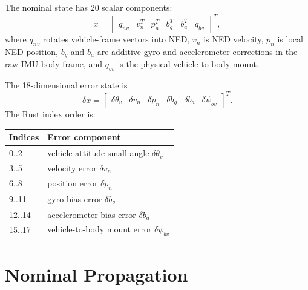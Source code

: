 \documentclass[11pt]{article}
\newcommand{\T}{^{T}}
\begin{document}
The nominal state has 20 scalar components:
\begin{equation}
  x=
  \begin{bmatrix}
  q_{nv} & v_n\T & p_n\T & b_g\T & b_a\T & q_{bv}
\end{bmatrix}\T ,
\end{equation}
where \(q_{nv}\) rotates vehicle-frame vectors into NED, \(v_n\) is NED
velocity, \(p_n\) is local NED position, \(b_g\) and \(b_a\) are additive gyro
and accelerometer corrections in the raw IMU body frame, and \(q_{bv}\) is the
physical vehicle-to-body mount.

The 18-dimensional error state is
\begin{equation}
  \delta x =
  \begin{bmatrix}
  \delta\theta_v &
  \delta v_n &
  \delta p_n &
  \delta b_g &
  \delta b_a &
  \delta\psi_{bv}
  \end{bmatrix}\T .
\end{equation}
The Rust index order is:
\begin{center}
\begin{tabular}{ll}
\toprule
Indices & Error component \\
\midrule
0..2 & vehicle-attitude small angle \(\delta\theta_v\) \\
3..5 & velocity error \(\delta v_n\) \\
6..8 & position error \(\delta p_n\) \\
9..11 & gyro-bias error \(\delta b_g\) \\
12..14 & accelerometer-bias error \(\delta b_a\) \\
15..17 & vehicle-to-body mount error \(\delta\psi_{bv}\) \\
\bottomrule
\end{tabular}
\end{center}

\section{Nominal Propagation}
\end{document}
